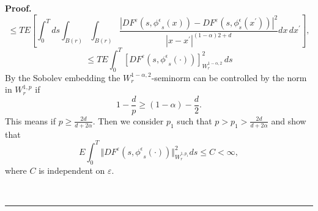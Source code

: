 \documentclass[a4paper,11pt]{article}
\newenvironment{proof}[1][Proof]{\textbf{#1.} }{\ \rule{0.5em}{0.5em}}
\newcommand{\eps}{\varepsilon}
\begin{document}
\begin{proof}
\begin{equation*}
\leq TE\left[ \int_{0}^{T}ds\int_{B(r)}\int_{B(r)}\frac{|DF^{\varepsilon }\left( s,%
{{\phi}^{\epsilon}}_{s}\left( x\right) \right) -DF^{\varepsilon
}\left( s, {\phi}^{\epsilon} _{s}\left( x^{\prime }\right) \right)
|^{2}}{|x-x^{\prime }|^{(1 - \alpha)2 + d} }dx\,dx^{\prime }\right]
,
\end{equation*}
\begin{equation*}
\leq TE\int_{0}^{T} [ DF^{\varepsilon }(s,{{\phi}^{\epsilon}}
_{s}(\cdot ))]_{W_{r}^{1 - \alpha, 2}}^{2} \, ds
\end{equation*}
By the Sobolev embedding the $W^{1 - \alpha,2}_r$-seminorm  can
be controlled by the norm in $W^{1,p}_r$ if
$$
 1 - \frac{d}{p} \ge (1-\alpha) - \frac{d}{2}.
$$
This means if $p \ge \frac{2d}{ d + 2 \alpha}$.
 Then we consider $p_{1} $ such that
$
p>{p_{1}}> \frac{2d}{ d + 2 \alpha}
$
 and show that
\begin{equation} \label{f7}
E\int_{0}^{T}\Vert DF^{\varepsilon }(s,{{\phi}^{\epsilon}}
_{s}(\cdot ))\Vert _{W_{r}^{1,p_{1}}}^{2}ds \le C < \infty,
\end{equation}
where $C$ is independent on $\eps$.


\end{proof}
\end{document}
